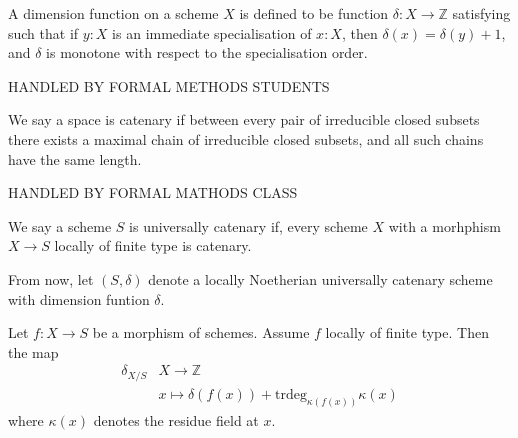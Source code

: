 %

\begin{definition}
  \label{def:dimfun}
  A dimension function on a scheme $X$ is defined to be function $\delta : X \rightarrow \mathbb{Z}$
  satisfying such that if $y : X$ is an immediate specialisation of $x : X$, then
  $\delta(x) = \delta(y) + 1$, and $\delta$ is monotone with respect to the
  specialisation order.

  HANDLED BY FORMAL METHODS STUDENTS
\end{definition}

\begin{definition}
  We say a space is catenary if between every pair of irreducible closed subsets there
  exists a maximal chain of irreducible closed subsets, and all such chains have the
  same length.

  HANDLED BY FORMAL MATHODS CLASS
\end{definition}

\begin{definition}
  \label{02J7}
  We say a scheme $S$ is universally catenary if, every scheme $X$ with a morhphism
  $X \rightarrow S$ locally of finite type is catenary.
\end{definition}

From now, let $(S, \delta)$ denote a locally Noetherian universally catenary scheme
with dimension funtion $\delta$.



\begin{theorem}
  \label{02JW}
  Let $f:X \rightarrow S$ be a morphism of schemes.
  Assume $f$ locally of finite type. Then the map
  \[
  \begin{split}
  \delta_{X / S} &X \rightarrow \mathbb{Z}\\
  &x \mapsto \delta (f (x)) + \text{trdeg}_{\kappa(f(x))} \kappa (x)
  \end{split}
  \]
  where $\kappa(x)$ denotes the residue field at $x$.

\end{theorem}


